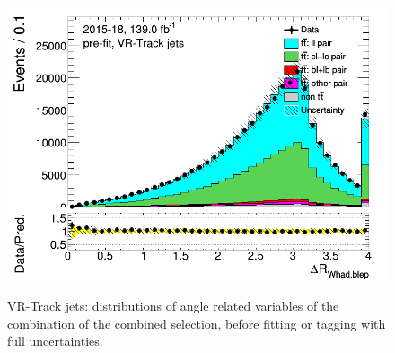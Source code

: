 \documentclass[letterpaper,12pt]{article}
\begin{document}
\begin{figure}[H]
	\includegraphics[width=.45\textwidth]{FTAG_plots/pretagNoRwwithhighpTVRJetsall/DataMC_h_dRWhadbleptrackjet.png} \\
	\caption{VR-Track jets: distributions of angle related variables of the combination 
	of the combined selection, before fitting or tagging with full uncertainties.} \label{fig:combined_angles_VRJets}
	\end{figure}
	
\end{document}
